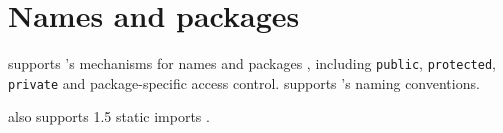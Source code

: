 \chapter{Names and packages}
\label{packages} 

\Xten{} supports \java's mechanisms for names and packages \cite[\S 6,\S 7]{jls2}, including {\tt public}, {\tt protected}, {\tt private} and package-specific access control. \Xten{} supports \java's naming conventions.

\Xten{} also supports \java{} 1.5 static imports \cite{jsr201}.
